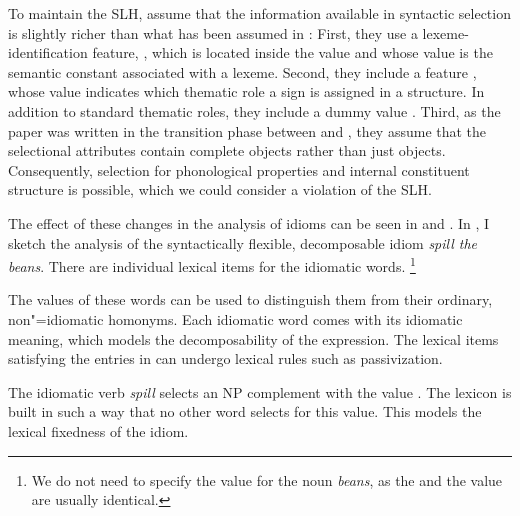 \documentclass[output=paper
                ,modfonts
                ,nonflat
	        ,collection
	        ,collectionchapter
	        ,collectiontoclongg
 	        ,biblatex
                ,babelshorthands
                ,newtxmath
                ,draftmode
                ,colorlinks, citecolor=brown
]{./langsci/langscibook}
\begin{document}
To maintain the SLH, \citet{KE94a} assume that the information available in syntactic selection is slightly richer than what has been assumed in \citet{ps2}:
First, they use a lexeme-identification feature, , which is located inside the  value and whose value is the semantic constant associated with a lexeme. 
Second, they include a feature , whose value indicates which thematic role a sign is assigned in a structure. In addition to standard thematic roles, they include a dummy value .
Third, as the paper was written in the transition phase between \citet{ps} and \citet{ps2}, they assume that the selectional attributes contain complete  objects rather than just  objects. 
Consequently, selection for phonological properties and internal constituent structure is possible, which we could consider a violation of the SLH. 

The effect of these changes in the analysis of idioms can be seen in  and . In , I sketch the analysis of the syntactically flexible, decomposable idiom \emph{spill the beans}.
There are individual lexical items for the idiomatic words.%
\footnote{We do not need to specify the  value for the noun \emph{beans}, as the  and the  value are usually identical.}


\eal %
\label{ke-spill}
\ex 
{}
\ex 
{}
\zl 

The  values of these words can be used to distinguish them from their ordinary, non"=idiomatic homonyms. 
Each idiomatic word comes with its idiomatic meaning, which models the decomposability of the expression. 
The lexical items satisfying the entries in  can undergo lexical rules such as passivization. 

The idiomatic verb \emph{spill} selects an NP complement with the  value . 
The lexicon is built in such a way that no other word selects for this  value. 
This models the lexical fixedness of the idiom.
\end{document}
